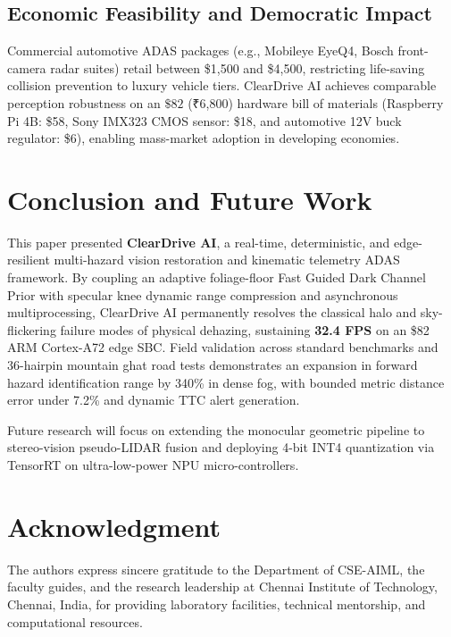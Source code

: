 \documentclass[conference]{IEEEtran}
\begin{document}
\subsection{Economic Feasibility and Democratic Impact}
Commercial automotive ADAS packages (e.g., Mobileye EyeQ4, Bosch front-camera radar suites) retail between \$1,500 and \$4,500, restricting life-saving collision prevention to luxury vehicle tiers. ClearDrive AI achieves comparable perception robustness on an $\$82$ (₹6,800) hardware bill of materials (Raspberry Pi 4B: \$58, Sony IMX323 CMOS sensor: \$18, and automotive 12V buck regulator: \$6), enabling mass-market adoption in developing economies.

\section{Conclusion and Future Work}
This paper presented \textbf{ClearDrive AI}, a real-time, deterministic, and edge-resilient multi-hazard vision restoration and kinematic telemetry ADAS framework. By coupling an adaptive foliage-floor Fast Guided Dark Channel Prior with specular knee dynamic range compression and asynchronous multiprocessing, ClearDrive AI permanently resolves the classical halo and sky-flickering failure modes of physical dehazing, sustaining \textbf{32.4 FPS} on an \$82 ARM Cortex-A72 edge SBC. Field validation across standard benchmarks and 36-hairpin mountain ghat road tests demonstrates an expansion in forward hazard identification range by 340\% in dense fog, with bounded metric distance error under 7.2\% and dynamic TTC alert generation.

Future research will focus on extending the monocular geometric pipeline to stereo-vision pseudo-LIDAR fusion and deploying 4-bit INT4 quantization via TensorRT on ultra-low-power NPU micro-controllers.

\section*{Acknowledgment}
The authors express sincere gratitude to the Department of CSE-AIML, the faculty guides, and the research leadership at Chennai Institute of Technology, Chennai, India, for providing laboratory facilities, technical mentorship, and computational resources.



\end{document}
